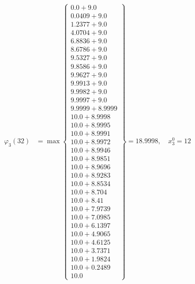 \documentclass{article}
\begin{document}
\begin{align*}
  
\varphi_{3}(32) &= \max \left\{ \begin{array}{c}
0.0 + 9.0 \\
 0.0409 + 9.0 \\
 1.2377 + 9.0 \\
 4.0704 + 9.0 \\
 6.8836 + 9.0 \\
 8.6786 + 9.0 \\
 9.5327 + 9.0 \\
 9.8586 + 9.0 \\
 9.9627 + 9.0 \\
 9.9913 + 9.0 \\
 9.9982 + 9.0 \\
 9.9997 + 9.0 \\
 9.9999 + 8.9999 \\
 10.0 + 8.9998 \\
 10.0 + 8.9995 \\
 10.0 + 8.9991 \\
 10.0 + 8.9972 \\
 10.0 + 8.9946 \\
 10.0 + 8.9851 \\
 10.0 + 8.9696 \\
 10.0 + 8.9283 \\
 10.0 + 8.8534 \\
 10.0 + 8.704 \\
 10.0 + 8.41 \\
 10.0 + 7.9739 \\
 10.0 + 7.0985 \\
 10.0 + 6.1397 \\
 10.0 + 4.9065 \\
 10.0 + 4.6125 \\
 10.0 + 3.7371 \\
 10.0 + 1.9824 \\
 10.0 + 0.2489 \\
 10.0
\end{array} \right\}=18.9998,\quad x_{3}^0=12\\
  
  
  

\end{align*}
\end{document}
